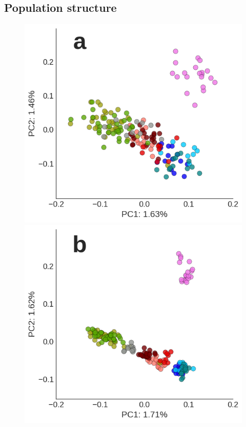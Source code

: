 \documentclass[12pt, one column]{article}
\begin{document}
\subsection*{Population structure}
\begin{figure}[H]
\includegraphics[scale=.35]{figures/poster_3a.png}
\includegraphics[scale=.35]{figures/poster_3b.png}

\end{figure}
\end{document}
